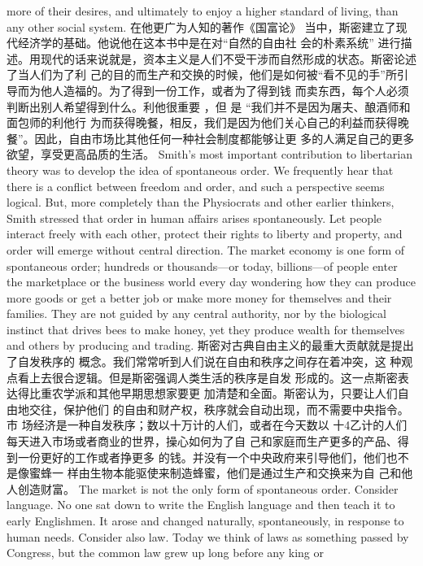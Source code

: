 \begin{paracol}{2}
more of their desires, and ultimately to enjoy a higher standard
of living, than any other social system.
\switchcolumn
在他更广为人知的著作《国富论》 当中，斯密建立了现代经济学的基础。他说他在这本书中是在对“自然的自由社
会的朴素系统” 进行描述。用现代的话来说就是，资本主义是人们不受干涉而自然形成的状态。斯密论述了当人们为了利
己的目的而生产和交换的时候，他们是如何被“看不见的手”所引导而为他人造福的。为了得到一份工作，或者为了得到钱
而卖东西，每个人必须判断出别人希望得到什么。利他很重要 ，但 是 “我们并不是因为屠夫、酿酒师和面包师的利他行
为而获得晚餐，相反，我们是因为他们关心自己的利益而获得晚餐”。因此，自由市场比其他任何一种社会制度都能够让更
多的人满足自己的更多欲望，享受更高品质的生活。
\switchcolumn*
Smith's most important contribution to libertarian theory
was to develop the idea of spontaneous order. We frequently 
hear that there is a conflict between freedom and order, and
such a perspective seems logical. But, more completely than the
Physiocrats and other earlier thinkers, Smith stressed that order
in human affairs arises spontaneously. Let people interact freely
with each other, protect their rights to liberty and property, and
order will emerge without central direction. The market economy is one form of spontaneous order; hundreds or thousands---or today, billions---of people enter the marketplace or
the business world every day wondering how they can produce
more goods or get a better job or make more money for themselves and their families. They are not guided by any central authority, nor by the biological instinct that drives bees to make
honey, yet they produce wealth for themselves and others by
producing and trading.
\switchcolumn
斯密对古典自由主义的最重大贡献就是提出了自发秩序的
概念。我们常常听到人们说在自由和秩序之间存在着冲突，这
种观点看上去很合逻辑。但是斯密强调人类生活的秩序是自发
形成的。这一点斯密表达得比重农学派和其他早期思想家要更
加清楚和全面。斯密认为，只要让人们自由地交往，保护他们
的自由和财产权，秩序就会自动出现，而不需要中央指令。市
场经济是一种自发秩序；数以十万计的人们，或者在今天数以
十4乙计的人们每天进入市场或者商业的世界，操心如何为了自
己和家庭而生产更多的产品、得到一份更好的工作或者挣更多
的钱。并没有一个中央政府来引导他们，他们也不是像蜜蜂一
样由生物本能驱使来制造蜂蜜，他们是通过生产和交换来为自
己和他人创造财富。
\switchcolumn*
The market is not the only form of spontaneous order. Consider language. No one sat down to write the English language
and then teach it to early Englishmen. It arose and changed
naturally, spontaneously, in response to human needs. Consider
also law. Today we think of laws as something passed by Congress, but the common law grew up long before any king or

\end{paracol}
